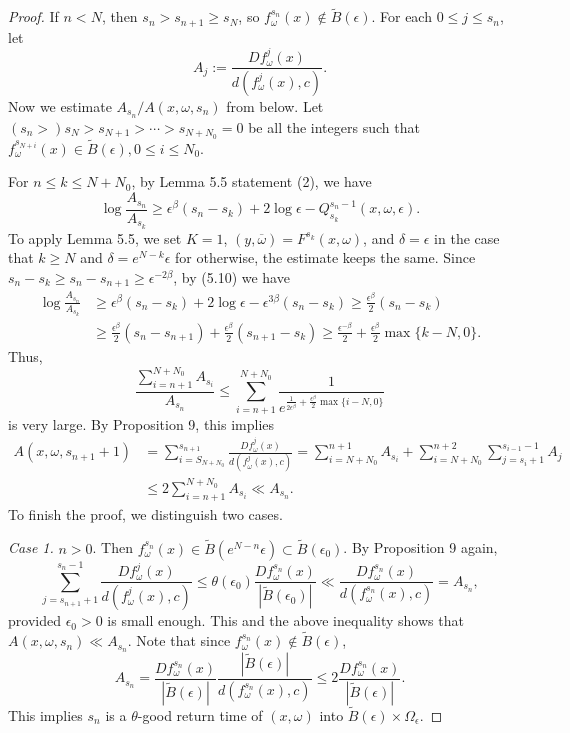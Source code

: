 \documentclass[10pt,a4paper]{amsart}
\begin{document}
\begin{proof}
If $n < N$, then $s_n > s_{n+1} \geq s_N$, so $f_{\omega}^{s_n} (x) \notin \tilde B(\epsilon)$. For each $0 \leq j \leq s_n$, let 
\[
A_j := \frac{D f_{\omega}^j(x)}{ d(f_{\omega}^j(x), c)}.
\]
Now we estimate $A_{s_n} / A(x, \omega, s_n)$ from below. Let $( s_n > ) s_N > s_{N+1} > \cdots > s_{N+N_0} = 0$ be all the integers such that $f_{\omega}^{s_{N+i}}(x) \in \tilde B(\epsilon), 0 \leq i \leq N_0$. 


For $n \leq k \leq N+N_0$, by Lemma 5.5 statement (2), we have
\[
\log \frac{A_{s_n}}{A_{s_k}} \geq \epsilon^{\beta} (s_n - s_k) + 2 \log \epsilon - Q_{s_k}^{s_n -1}(x, \omega, \epsilon).
\]
To apply Lemma 5.5, we set $K=1$, $(y, \overline \omega) = F^{s_k}(x, \omega)$, and $\delta = \epsilon$ in the case that $k \geq N$ and $\delta = e^{N-k} \epsilon$ for otherwise, the estimate keeps the same. Since $s_n - s_k \geq s_n - s_{n+1} \geq \epsilon^{-2 \beta}$, by (5.10) we have
\begin{align*}
\log \frac{A_{s_n}}{A_{s_k}} & \geq \epsilon^{\beta} (s_n - s_k) + 2 \log \epsilon - \epsilon^{3 \beta} (s_n - s_k) \geq \frac{\epsilon^{\beta}}{2} (s_n - s_k) \\
& \geq \frac{\epsilon^{\beta}}{2} (s_n - s_{n+1}) + \frac{\epsilon^{\beta}}{2} (s_{n+1} - s_k) \geq \frac{\epsilon^{-\beta}}{2} + \frac{\epsilon^{\beta}}{2} \max\{ k- N, 0 \}.
\end{align*}
Thus, 
\[
\frac{\sum_{i=n+1}^{N + N_0} A_{s_i}}{A_{s_n}} \leq \sum_{i=n+1}^{N + N_0} \frac{1}{e^{\frac{1}{2 \epsilon^{\beta}} +  \frac{\epsilon^{\beta}}{2} \max\{ i- N, 0 \}}}
\]
is very large. By Proposition 9, this implies 
\begin{align*}
A(x, \omega, s_{n+1} + 1)& = \sum_{i=S_{N+N_0}}^{s_{n+1}} \frac{D f_{\omega}^j(x)}{ d(f_{\omega}^j(x), c)} = \sum_{i = N+N_0}^{n+1} A_{s_i} + \sum_{i = N+N_0}^{n+2} \sum_{j = s_i+1}^{s_{i-1} -1} A_j \\
& \leq 2 \sum_{i = n+1}^{N + N_0} A_{s_i} \ll A_{s_n}. 
\end{align*}
To finish the proof, we distinguish two cases.


{\it Case 1.} $n > 0$. Then $f_{\omega}^{s_n} (x) \in \tilde B(e^{N-n} \epsilon) \subset \tilde B(\epsilon_0)$. By Proposition 9 again, 
\[
\sum_{j = s_{n+1} +1}^{s_n -1}  \frac{D f_{\omega}^j(x)}{ d(f_{\omega}^j(x), c)} \leq \theta(\epsilon_0) \frac{Df_{\omega}^{s_n}(x)}{ |\tilde B(\epsilon_0)|} \ll  \frac{D f_{\omega}^{s_n}(x)}{ d(f_{\omega}^{s_n}(x), c)} = A_{s_n},
\]
provided $\epsilon_0 > 0$ is small enough. This and the above inequality shows that $A(x, \omega, s_n) \ll A_{s_n}$. Note that since $f_{\omega}^{s_n} (x) \notin \tilde B(\epsilon)$,
\[
A_{s_n} = \frac{Df_{\omega}^{s_n}(x)}{|\tilde B(\epsilon)|} \frac{|\tilde B(\epsilon) |}{d(f_{\omega}^{s_n}(x), c)} \leq 2  \frac{Df_{\omega}^{s_n}(x)}{|\tilde B(\epsilon)|}.
\]
This implies $s_n$ is a $\theta$-good return time of $(x, \omega)$ into $\tilde B(\epsilon) \times \Omega_{\epsilon}$.



\end{proof}
\end{document}
